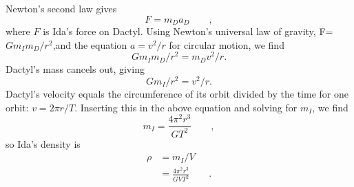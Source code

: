Newton's second law gives
\begin{equation*}
        F  =  m_D a_D   \qquad   ,
\end{equation*}
where $F$ is Ida's force on Dactyl. Using Newton's universal
law of gravity, F= $Gm_I m_D/r^2$,and the equation 
$a=v^2/r$ for circular motion, we find
\begin{equation*}
        Gm_I m_D/ r ^2 =  m_Dv ^2/ r   .
\end{equation*}
Dactyl's mass cancels out, giving
\begin{equation*}
        Gm_I/ r ^2 =  v ^2/ r   .
\end{equation*}
Dactyl's velocity equals the circumference of its orbit
divided by the time for one orbit: $v=2\pi r/T$. Inserting
this in the above equation and solving for $m_I$, we find
\begin{equation*}
        m_I     =  \frac{4\pi^2r^3}{GT^2}   \qquad   ,
\end{equation*}
so Ida's density is
\begin{align*}
        \rho      &=  m_I/ V  \\
                  &=  \frac{4\pi^2r^3}{GVT^2}  \qquad   .
\end{align*}



